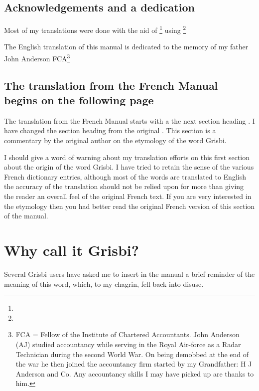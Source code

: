 \subsection*{Acknowledgements and a dedication}
Most of my translations were done with the aid of \footnote{\urlGtrans{}}
using \footnote{\urlGtransShell{}}

The English translation of this manual is dedicated to the memory of my father John Anderson FCA\footnote{FCA = Fellow of the Institute of Chartered Accountants.  John Anderson (AJ)  studied accountancy while serving in the Royal Air-force as a Radar Technician during the second World War.  On being demobbed at the end of the war he then joined the accountancy firm started by my Grandfather: H J Anderson and Co.  Any accountancy skills I may have picked up are thanks to him.}

\subsection*{The translation from the French Manual begins on the following page}
The translation from the French Manual starts with a the next section heading . I have changed the section heading from the original  .  This section is a commentary by the original author on the etymology of the word Grisbi.

I should give a word of warning about my translation efforts on this first section about the origin of the word Grisbi.  I have tried to retain the sense of the various French dictionary entries,  although most of the words are translated to English the accuracy of the translation should not be relied upon for more than giving the reader an overall feel of the original French text.  If you are very interested in the etymology then you had better read the original French version of this section of the manual.  
\newpage 
\section*{Why call it Grisbi?}

Several \gls{Grisbi} users have asked me to insert in the manual a brief
reminder of the meaning of this word, which, to my chagrin, fell back into disuse.


